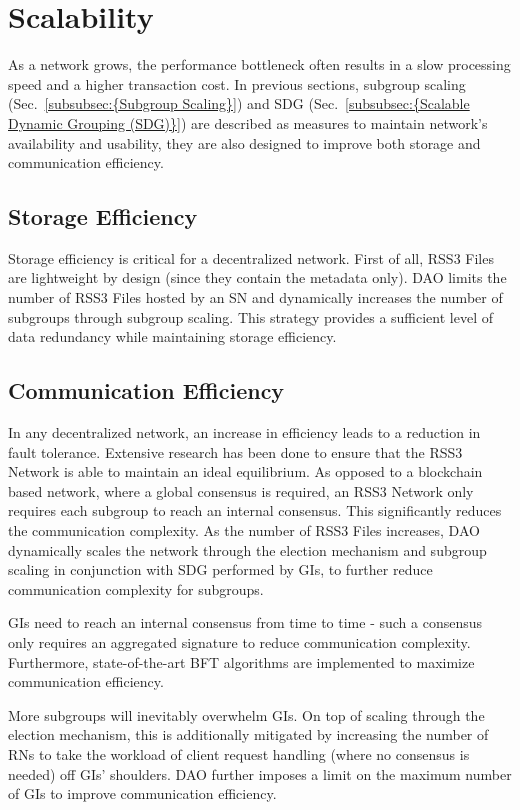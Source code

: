 \section{Scalability}

As a network grows, the performance bottleneck often results in a slow processing speed and a higher transaction cost. In previous sections, subgroup scaling (Sec.~\ref{subsubsec:{Subgroup Scaling}}) and SDG (Sec.~\ref{subsubsec:{Scalable Dynamic Grouping (SDG)}}) are described as measures to maintain network's availability and usability, they are also designed to improve both storage and communication efficiency.

\subsection{Storage Efficiency}

Storage efficiency is critical for a decentralized network. First of all, RSS3 Files are lightweight by design (since they contain the metadata only). DAO limits the number of RSS3 Files hosted by an SN and dynamically increases the number of subgroups through subgroup scaling. This strategy provides a sufficient level of data redundancy while maintaining storage efficiency.

\subsection{Communication Efficiency}

In any decentralized network, an increase in efficiency leads to a reduction in fault tolerance. Extensive research has been done to ensure that the RSS3 Network is able to maintain an ideal equilibrium. As opposed to a blockchain based network\cite{bitcoin-whitepaper, eth-whitepaper}, where a global consensus is required, an RSS3 Network only requires each subgroup to reach an internal consensus. This significantly reduces the communication complexity. As the number of RSS3 Files increases, DAO dynamically scales the network through the election mechanism and subgroup scaling in conjunction with SDG performed by GIs, to further reduce communication complexity for subgroups.

GIs need to reach an internal consensus from time to time - such a consensus only requires an aggregated signature to reduce communication complexity. Furthermore, state-of-the-art BFT algorithms are implemented to maximize communication efficiency\cite{Mir-BFT,ibft}.

More subgroups will inevitably overwhelm GIs. On top of scaling through the election mechanism, this is additionally mitigated by increasing the number of RNs to take the workload of client request handling (where no consensus is needed) off GIs' shoulders. DAO further imposes a limit on the maximum number of GIs to improve communication efficiency.
